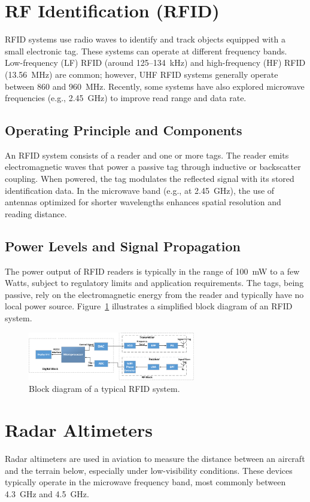 \documentclass{article}
\begin{document}
\section{RF Identification (RFID)}
RFID systems use radio waves to identify and track objects equipped with a small electronic tag. These systems can operate at different frequency bands. Low-frequency (LF) RFID (around 125--134~kHz) and high-frequency (HF) RFID (13.56~MHz) are common; however, UHF RFID systems generally operate between 860 and 960~MHz. Recently, some systems have also explored microwave frequencies (e.g., 2.45~GHz) to improve read range and data rate.

\subsection*{Operating Principle and Components}
An RFID system consists of a reader and one or more tags. The reader emits electromagnetic waves that power a passive tag through inductive or backscatter coupling. When powered, the tag modulates the reflected signal with its stored identification data. In the microwave band (e.g., at 2.45~GHz), the use of antennas optimized for shorter wavelengths enhances spatial resolution and reading distance.

\subsection*{Power Levels and Signal Propagation}
The power output of RFID readers is typically in the range of 100~mW to a few Watts, subject to regulatory limits and application requirements. The tags, being passive, rely on the electromagnetic energy from the reader and typically have no local power source. Figure~\ref{fig:rfi_block} illustrates a simplified block diagram of an RFID system.

\begin{figure}[H]
    \centering
    \includegraphics[width=0.65\textwidth]{rfid_block_diagram.png}
    \caption{Block diagram of a typical RFID system.}
    \label{fig:rfi_block}
\end{figure}

\section{Radar Altimeters}
Radar altimeters are used in aviation to measure the distance between an aircraft and the terrain below, especially under low-visibility conditions. These devices typically operate in the microwave frequency band, most commonly between 4.3~GHz and 4.5~GHz.
\end{document}
